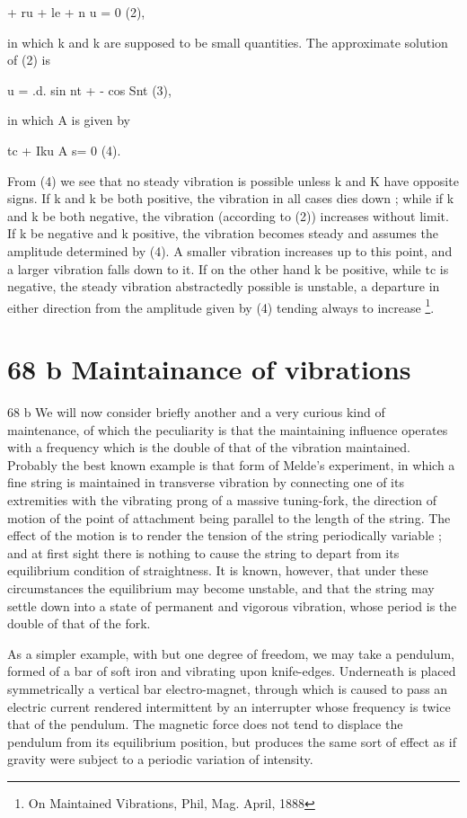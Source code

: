 + ru + le + n u = 0 (2),

in which k and k are supposed to be small quantities. The approximate
solution of (2) is

u = .d. sin nt + - cos Snt (3),

in which A is given by

tc + Iku A s= 0 (4).

From (4) we see that no steady vibration is possible unless k and K have
opposite signs. If k and k be both positive, the vibration in all cases
dies down ; while if k and k be both negative, the vibration
(according to (2)) increases without limit. If k be negative and k positive, the
vibration becomes steady and assumes the amplitude determined by (4). A
smaller vibration increases up to this point, and a larger vibration
falls down to it. If on the other hand k be positive, while tc is
negative, the steady vibration abstractedly possible is unstable, a
departure in either direction from the amplitude given by (4) tending
always to increase
\footnote{On Maintained Vibrations, Phil, Mag. April, 1888}.

\section{68 b Maintainance of vibrations}\label{sect:68b}
68 b We will now consider briefly another and a very curious kind of
maintenance, of which the peculiarity is that the maintaining influence
operates with a frequency which is the double of that of the vibration
maintained. Probably the best known example is that form of Melde's
experiment, in which a fine string is maintained in transverse vibration
by connecting one of its extremities with the vibrating prong of a
massive tuning-fork, the direction of motion of the point of
attachment being parallel to the length of the string. The effect of the
motion is to render the tension of the string periodically variable ;
and at first sight there is nothing to cause the string to depart from
its equilibrium condition of straightness. It is known, however, that
under these circumstances the equilibrium may become unstable, and that
the string may settle down into a state of permanent and vigorous
vibration, whose period is the double of that of the fork.

As a simpler example, with but one degree of freedom, we may take a
pendulum, formed of a bar of soft iron and vibrating upon knife-edges.
Underneath is placed symmetrically a vertical bar electro-magnet,
through which is caused to pass an electric current rendered
intermittent by an interrupter whose frequency is twice that of the
pendulum. The magnetic force does not tend to displace the pendulum from
its equilibrium position, but produces the same sort of effect as if
gravity were subject to a periodic variation of intensity.

